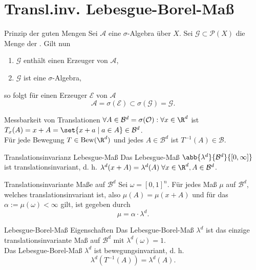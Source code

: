 \section*{Transl.inv. Lebesgue-Borel-Maß}

\begin{karte}{Prinzip der guten Mengen}
	Sei \( \mathcal{A} \) eine \(\sigma\)-Algebra über \(X\). Sei \( \mathcal{G} \subset \mathcal{P}(X) \) 
	die Menge der . Gilt nun 
	\begin{enumerate}
		\item \( \mathcal{G} \) enthält einen Erzeuger von \(\mathcal{A}\),
		\item \( \mathcal{G} \) ist eine \(\sigma\)-Algebra,
	\end{enumerate}
	so folgt für einen Erzeuger \( \mathcal{E} \) von \( \mathcal{A} \) 
	\[ \mathcal{A} = \sigma(\mathcal{E}) \subset \sigma(\mathcal{G}) = \mathcal{G}. \]
\end{karte}

\begin{karte}{Messbarkeit von Translationen}
	\( \forall A\in \mathcal{B}^d = \sigma(\mathcal{O}): \forall x\in \R^d \) ist 
	\( T_x(A) = x + A = \set{ x + a \;|\; a\in A } \in \mathcal{B}^d \).\\
	Für jede Bewegung \( T\in \mathrm{Bew}(\R^d) \) und jedes \(A \in \mathcal{B}^d \) ist \( T^{-1}(A) \in \mathcal{B} \).
\end{karte}

\begin{karte}{Translationsinvarianz Lebesgue-Maß}
	Das Lebesgue-Maß \( \abb{\lambda^d}{\mathcal{B}^d}{[0,\infty]} \) ist 
	translationsinvariant, d. h. \( \lambda^d(x+A) = \lambda^d(A) \; \forall x\in \R^d, A\in \mathcal{B}^d \).
\end{karte}

\begin{karte}{Translationsinvariante Maße auf \(\mathcal{B}^d\)}
	Sei \( \omega = [0,1]^n \).
	Für jedes Maß \( \mu \) auf \(\mathcal{B}^d\), welches translationsinvariant ist, also 
	\( \mu(A) = \mu(x + A) \) und für das \( \alpha := \mu(\omega) < \infty \) gilt, ist gegeben durch 
	\[ \mu= \alpha \cdot \lambda^d. \]
\end{karte}

\begin{karte}{Lebesgue-Borel-Maß Eigenschaften}
	Das Lebesgue-Borel-Maß \(\lambda^d \) ist das einzige translationsinvariante Maß auf \( \mathcal{B}^d \) 
	mit \( \lambda^d(\omega) = 1 \).\\
	Das Lebesgue-Borel-Maß \( \lambda^d \) ist bewegungsinvariant, d. h. 
	\[ \lambda^d(T^{-1}(A)) = \lambda^d(A). \]
\end{karte}

